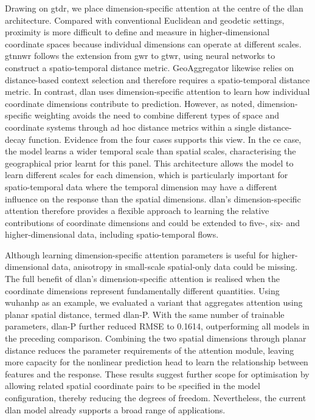 \documentclass[]{interact}
\newcommand{\DLAN}{\gls{dlan}\xspace}
\newcommand{\GTNNWR}{\gls{gtnnwr}\xspace}
\newcommand{\GAgg}{GeoAggregator\xspace}
\newcommand{\COO}{\gls{ce}\xspace}
\newcommand{\WuhanHP}{\gls{wuhanhp}\xspace}
\begin{document}
Drawing on \gls{gtdr}, we place dimension-specific attention at the centre of the \DLAN architecture.
Compared with conventional Euclidean and geodetic settings, proximity is more difficult to define and measure in higher-dimensional coordinate spaces because individual dimensions can operate at different scales.
\GTNNWR follows the extension from \gls{gwr} to \gls{gtwr}, using neural networks to construct a spatio-temporal distance metric.
\GAgg likewise relies on distance-based context selection and therefore requires a spatio-temporal distance metric.
In contrast, \DLAN uses dimension-specific attention to learn how individual coordinate dimensions contribute to prediction.
However, as \citet{HuLu-2023} noted, dimension-specific weighting avoids the need to combine different types of space and coordinate systems through ad hoc distance metrics within a single distance-decay function.
Evidence from the four cases supports this view.
In the \COO case, the model learns a wider temporal scale than spatial scales,
characterising the geographical prior learnt for this panel.
This architecture allows the model to learn different scales for each dimension, which is particularly important for spatio-temporal data where the temporal dimension may have a different influence on the response than the spatial dimensions.
\DLAN's dimension-specific attention therefore provides a flexible approach to learning the relative contributions of coordinate dimensions and could be extended to five-, six- and higher-dimensional data, including spatio-temporal flows.

Although learning dimension-specific attention parameters is useful for higher-dimensional data,
anisotropy in small-scale spatial-only data could be missing.
The full benefit of \DLAN's dimension-specific attention is realised when the coordinate dimensions represent fundamentally different quantities.
Using \WuhanHP as an example, we evaluated a variant that aggregates attention using planar spatial distance, termed \DLAN-P.
With the same number of trainable parameters, \DLAN-P further reduced RMSE to 0.1614, outperforming all models in the preceding comparison.
Combining the two spatial dimensions through planar distance reduces the parameter requirements of the attention module, leaving more capacity for the nonlinear prediction head to learn the relationship between features and the response.
These results suggest further scope for optimisation by allowing related spatial coordinate pairs to be specified in the model configuration, thereby reducing the degrees of freedom.
Nevertheless, the current \DLAN model already supports a broad range of applications.
\end{document}
